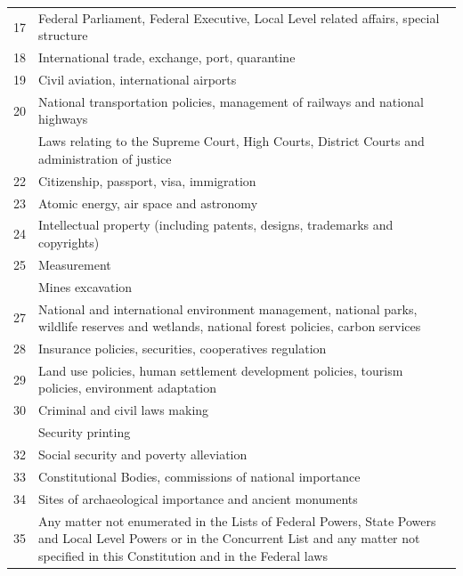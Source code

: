 \documentclass[
  openany]{book}
\begin{document}
\begin{longtable}[t]{r>{\raggedright\arraybackslash}p{35em}}
17 & Federal Parliament, Federal Executive, Local Level related affairs, special structure\\
18 & International trade, exchange, port, quarantine\\
19 & Civil aviation, international airports\\
20 & National transportation policies, management of railways and national highways\\
\addlinespace
21 & Laws relating to the Supreme Court, High Courts, District Courts and administration of justice\\
22 & Citizenship, passport, visa, immigration\\
23 & Atomic energy, air space and astronomy\\
24 & Intellectual property (including patents, designs, trademarks and copyrights)\\
25 & Measurement\\
\addlinespace
26 & Mines excavation\\
27 & National and international environment management, national parks, wildlife reserves and wetlands, national forest policies, carbon services\\
28 & Insurance policies, securities, cooperatives regulation\\
29 & Land use policies, human settlement development policies, tourism policies, environment adaptation\\
30 & Criminal and civil laws making\\
\addlinespace
31 & Security printing\\
32 & Social security and poverty alleviation\\
33 & Constitutional Bodies, commissions of national importance\\
34 & Sites of archaeological importance and ancient monuments\\
35 & Any matter not enumerated in the Lists of Federal Powers, State Powers and Local Level Powers or in the Concurrent List and any matter not specified in this Constitution and in the Federal laws\\
\bottomrule
\end{longtable}
\endgroup{}

\begingroup\fontsize{10}{12}\selectfont
\end{document}
